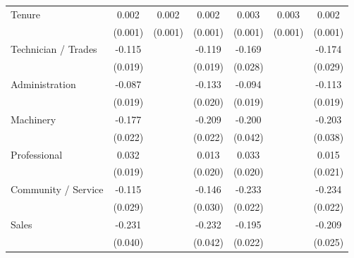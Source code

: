 {\begin{tabular}{l*{6}{c}}
Tenure              &       0.002\sym{**} &       0.002\sym{**} &       0.002\sym{**} &       0.003\sym{***}&       0.003\sym{***}&       0.002\sym{***}\\
                    &     (0.001)         &     (0.001)         &     (0.001)         &     (0.001)         &     (0.001)         &     (0.001)         \\
Technician / Trades &      -0.115\sym{***}&                     &      -0.119\sym{***}&      -0.169\sym{***}&                     &      -0.174\sym{***}\\
                    &     (0.019)         &                     &     (0.019)         &     (0.028)         &                     &     (0.029)         \\
Administration      &      -0.087\sym{***}&                     &      -0.133\sym{***}&      -0.094\sym{***}&                     &      -0.113\sym{***}\\
                    &     (0.019)         &                     &     (0.020)         &     (0.019)         &                     &     (0.019)         \\
Machinery           &      -0.177\sym{***}&                     &      -0.209\sym{***}&      -0.200\sym{***}&                     &      -0.203\sym{***}\\
                    &     (0.022)         &                     &     (0.022)         &     (0.042)         &                     &     (0.038)         \\
Professional        &       0.032\sym{*}  &                     &       0.013         &       0.033         &                     &       0.015         \\
                    &     (0.019)         &                     &     (0.020)         &     (0.020)         &                     &     (0.021)         \\
Community / Service &      -0.115\sym{***}&                     &      -0.146\sym{***}&      -0.233\sym{***}&                     &      -0.234\sym{***}\\
                    &     (0.029)         &                     &     (0.030)         &     (0.022)         &                     &     (0.022)         \\
Sales               &      -0.231\sym{***}&                     &      -0.232\sym{***}&      -0.195\sym{***}&                     &      -0.209\sym{***}\\
                    &     (0.040)         &                     &     (0.042)         &     (0.022)         &                     &     (0.025)         \\

\end{tabular}}
